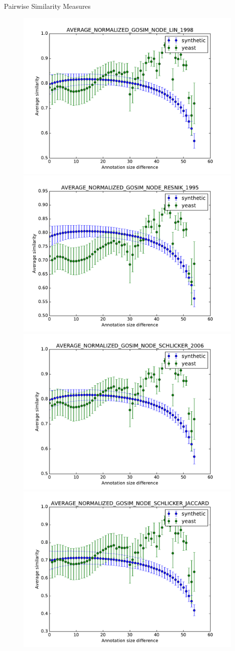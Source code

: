 \documentclass{beamer}
\begin{document}
\begin{frame}{Pairwise Similarity Measures}
\begin{figure}
\includegraphics[width=0.5\linewidth, height=0.4\textheight]{pairwise_diff/SIM_GROUPWISE_AVERAGE_NORMALIZED_GOSIM_SIM_PAIRWISE_DAG_NODE_LIN_1998_diff.pdf}
\includegraphics[width=0.5\linewidth, height=0.4\textheight]{pairwise_diff/SIM_GROUPWISE_AVERAGE_NORMALIZED_GOSIM_SIM_PAIRWISE_DAG_NODE_RESNIK_1995_diff.pdf} \\
\includegraphics[width=0.5\linewidth, height=0.4\textheight]{pairwise_diff/SIM_GROUPWISE_AVERAGE_NORMALIZED_GOSIM_SIM_PAIRWISE_DAG_NODE_SCHLICKER_2006_diff.pdf}
\includegraphics[width=0.5\linewidth, height=0.4\textheight]{pairwise_diff/SIM_GROUPWISE_AVERAGE_NORMALIZED_GOSIM_SIM_PAIRWISE_DAG_NODE_SCHLICKER_JACCARD_diff.pdf}
\end{figure}
\end{frame}
\end{document}

